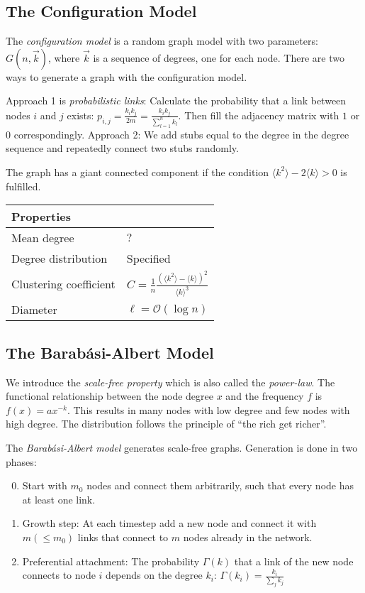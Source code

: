 \documentclass[english]{panikzettel}
\renewcommand\O{\mathcal{O}}
\begin{document}
\subsection{The Configuration Model}

The \emph{configuration model} is a random graph model with two parameters: $G(n,\vec{k})$, where $\vec{k}$ is a sequence of degrees, one for each node.
There are two ways to generate a graph with the configuration model.

Approach 1 is \emph{probabilistic links}:
Calculate the probability that a link between nodes $i$ and $j$ exists: $p_{i,j}=\frac{k_i k_j}{2m}=\frac{k_i k_j}{\sum_{l=1}^n k_l}$.
Then fill the adjacency matrix with $1$ or $0$ correspondingly.
Approach 2: We add stubs equal to the degree in the degree sequence and repeatedly connect two stubs randomly.

The graph has a giant connected component if the condition $\langle k^2 \rangle -2 \langle k  \rangle > 0$ is fulfilled.
\begin{center}
    \begin{tabular}{|l|l|}
        Properties & \\ \hline
        Mean degree & $?$ \\
        Degree distribution & Specified \\
        Clustering coefficient & $C = \frac{1}{n} \frac{(\langle k^2 \rangle - \langle k \rangle)^2}{\langle k \rangle^3}$ \\
        Diameter & $\ell = \O(\log n)$ \\
    \end{tabular}
\end{center}

\subsection{The Barabási-Albert Model}

We introduce the \emph{scale-free property} which is also called the \emph{power-law}.
The functional relationship between the node degree $x$ and the frequency $f$ is $f(x)=a x^{-k}$.
This results in many nodes with low degree and few nodes with high degree.
The distribution follows the principle of ``the rich get richer''.

The \emph{Barabási-Albert model} generates scale-free graphs.
Generation is done in two phases:
\begin{enumerate}
    \setcounter{enumi}{-1}
    \item Start with $m_0$ nodes and connect them arbitrarily, such that every node has at least one link.
    \item Growth step: At each timestep add a new node and connect it with $m (\leq m_0)$ links that connect to $m$ nodes already in the network.
    \item Preferential attachment: The probability $\Gamma(k)$ that a link of the new node connects to node $i$ depends on the degree $k_i$: $\Gamma(k_i) = \frac{k_i}{\sum_j k_j}$
\end{enumerate}
\end{document}
